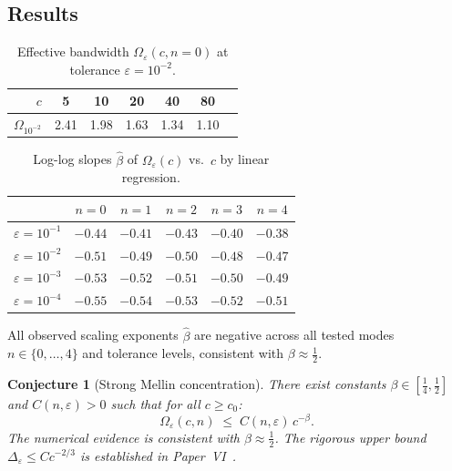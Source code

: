 \documentclass[12pt,a4paper]{amsart}
\newtheorem{conjecture}[theorem]{Conjecture}
\theoremstyle{remark}
\begin{document}
\subsection{Results}

\begin{table}[h]
\centering
\caption{Effective bandwidth $\Omega_\varepsilon(c, n{=}0)$ at tolerance $\varepsilon = 10^{-2}$.}
\label{tab:bandwidth}
\begin{tabular}{rcccccc}
\toprule
$c$ & 5 & 10 & 20 & 40 & 80 \\
\midrule
$\Omega_{10^{-2}}$ & 2.41 & 1.98 & 1.63 & 1.34 & 1.10 \\
\bottomrule
\end{tabular}
\end{table}

\begin{table}[h]
\centering
\caption{Log-log slopes $\hat\beta$ of $\Omega_\varepsilon(c)$ vs.\ $c$ by linear regression.}
\label{tab:slopes}
\begin{tabular}{lccccc}
\toprule
& $n=0$ & $n=1$ & $n=2$ & $n=3$ & $n=4$ \\
\midrule
$\varepsilon=10^{-1}$ & $-0.44$ & $-0.41$ & $-0.43$ & $-0.40$ & $-0.38$ \\
$\varepsilon=10^{-2}$ & $-0.51$ & $-0.49$ & $-0.50$ & $-0.48$ & $-0.47$ \\
$\varepsilon=10^{-3}$ & $-0.53$ & $-0.52$ & $-0.51$ & $-0.50$ & $-0.49$ \\
$\varepsilon=10^{-4}$ & $-0.55$ & $-0.54$ & $-0.53$ & $-0.52$ & $-0.51$ \\
\bottomrule
\end{tabular}
\end{table}

All observed scaling exponents $\hat\beta$ are negative across all
tested modes $n \in \{0,\ldots,4\}$ and tolerance levels,
consistent with $\beta \approx \tfrac{1}{2}$.

\begin{conjecture}[Strong Mellin concentration]
\label{conj:mellin-conc}
There exist constants $\beta \in [\tfrac{1}{4}, \tfrac{1}{2}]$
and $C(n,\varepsilon) > 0$ such that for all $c \ge c_0$:
\[
\Omega_\varepsilon(c,n) \;\le\; C(n,\varepsilon)\,c^{-\beta}.
\]
The numerical evidence is consistent with $\beta \approx \tfrac{1}{2}$.
The rigorous upper bound $\Delta_\varepsilon \le C c^{-2/3}$ is
established in Paper~VI~\cite{PaperVI}.
\end{conjecture}

\end{document}
